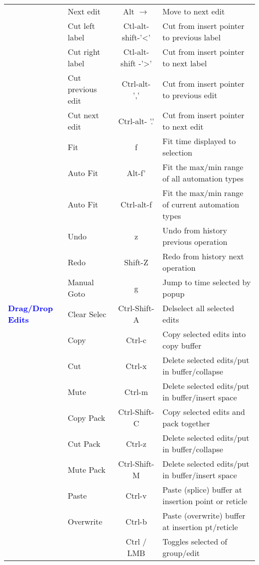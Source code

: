 \begin{center}
\begin{longtable}{ >{\bfseries}p{2cm} l c p{6cm}}
        & Next edit & Alt $\rightarrow$ & Move to next edit \\        
        & Cut left label & Ctl-alt-shift-'<' & Cut from insert pointer to previous label \\        
        & Cut right label & Ctl-alt-shift -'>' & Cut from insert pointer to next label \\        
        & Cut previous edit & Ctrl-alt- ',' & Cut from insert pointer to previous edit \\        
        & Cut next edit & Ctrl-alt- '.' & Cut from insert pointer to next edit \\        
        & Fit & f & Fit time displayed to selection \\        
        & Auto Fit & Alt-f' & Fit the max/min range of all automation types \\        
        & Auto Fit & Ctrl-alt-f & Fit the max/min range of current automation types \\        
        & Undo & z & Undo from history previous operation \\        
        & Redo & Shift-Z & Redo from history next operation \\        
        & Manual Goto & g & Jump to time selected by popup \\
        \midrule
        \textcolor{blue}{Drag/Drop Edits} & Clear Selec & Ctrl-Shift-A & Delselect all selected edits \\        
        & Copy & Ctrl-c & Copy selected edits into copy buffer \\        
        & Cut & Ctrl-x & Delete selected edits/put in buffer/collapse \\        
        & Mute & Ctrl-m & Delete selected edits/put in buffer/insert space \\        
        & Copy Pack & Ctrl-Shift-C & Copy selected edits and pack together \\        
        & Cut Pack & Ctrl-z & Delete selected edits/put in buffer/collapse \\        
        & Mute Pack & Ctrl-Shift-M & Delete selected edits/put in buffer/insert space \\        
        & Paste & Ctrl-v & Paste (splice) buffer at insertion point or reticle \\        
        & Overwrite & Ctrl-b & Paste (overwrite) buffer at insertion pt/reticle \\        
        &  & Ctrl / LMB & Toggles selected of group/edit \\        

\end{longtable}
\end{center}

